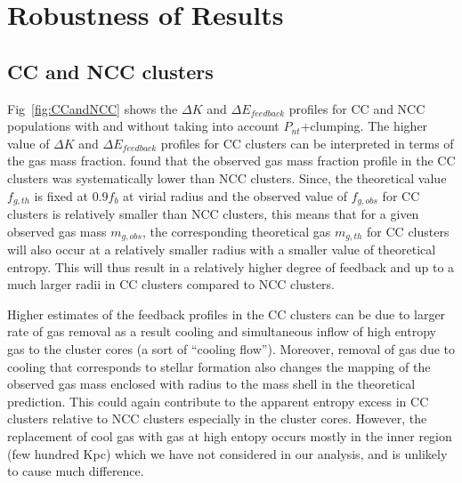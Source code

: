 \documentclass[a4paper,fleqn,usenatbib]{mnras}
\begin{document}
\section{Robustness of Results}
\subsection{CC and NCC clusters}
Fig~\ref{fig:CCandNCC} shows the $\Delta K$ and $\Delta E_{feedback}$ profiles for CC  and NCC populations with and without taking into account $P_{nt}$+clumping. The higher value of $\Delta K$ and $\Delta E_{feedback}$ profiles for CC clusters can be interpreted in terms of the gas mass fraction. \cite{Eckert2013b}  found that the observed gas mass fraction profile in the CC clusters was systematically lower than NCC clusters. Since, the theoretical value $f_{g,th}$ is fixed at $0.9f_b$ at virial radius and the observed value of $f_{g,obs}$ for CC clusters is relatively smaller than NCC clusters, this means that for a given observed gas mass $m_{g,obs}$, the corresponding theoretical gas $m_{g,th}$ for CC clusters will also occur at a relatively smaller radius with a smaller value of theoretical entropy. This will thus result in a relatively higher degree of feedback and up to a much larger radii in CC clusters compared to NCC clusters. 

Higher estimates of the feedback profiles in the CC clusters can be due to larger rate of gas removal as a result cooling and simultaneous  inflow of high entropy gas to the cluster cores  (a sort of ``cooling flow''). Moreover, removal of gas due to cooling that corresponds to stellar formation also changes the mapping of the observed gas mass enclosed with radius to the mass shell in the theoretical prediction. This could again contribute to the apparent entropy excess in CC clusters relative to NCC clusters especially in the cluster cores. However, the replacement of cool gas with gas at high entopy occurs mostly in the inner region (few hundred Kpc) which we have not considered in our analysis, and is unlikely to cause much difference.
\end{document}
